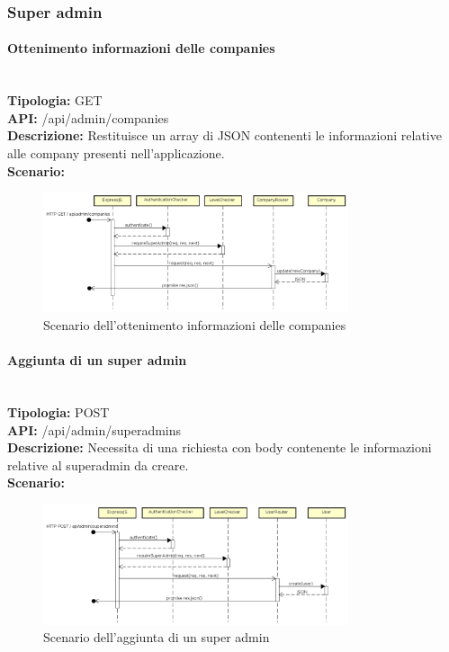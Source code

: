 \newpage
\subsubsection{Super admin}
\paragraph{Ottenimento informazioni delle companies}\mbox{}\\
\textbf{Tipologia:} GET \\
\textbf{API:} /api/admin/companies \\
\textbf{Descrizione:} Restituisce un array di JSON contenenti le informazioni relative alle company presenti nell'applicazione. \\
\textbf{Scenario:} 
\begin{figure}[H]
\centering
\includegraphics[width=0.8\textwidth]{res/sections/backend/sequence/(GET)companySA.png}
\caption{Scenario dell'ottenimento informazioni delle companies}
\end{figure}

\newpage
\paragraph{Aggiunta di un super admin}\mbox{}\\
\textbf{Tipologia:} POST \\
\textbf{API:} /api/admin/superadmins \\
\textbf{Descrizione:} Necessita di una richiesta con body contenente le informazioni relative al superadmin da creare. \\
\textbf{Scenario:} 
\begin{figure}[H]
\centering
\includegraphics[width=0.8\textwidth]{res/sections/backend/sequence/(POST)superadmin.png}
\caption{Scenario dell'aggiunta di un super admin}
\end{figure}

